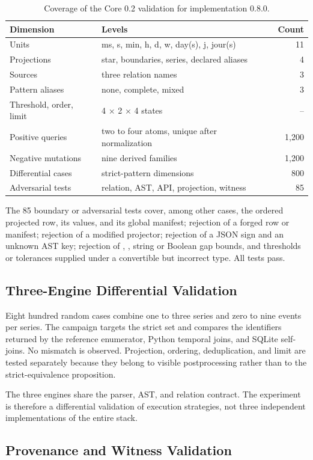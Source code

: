 \begin{table}[H]
\centering
\caption{Coverage of the Core 0.2 validation for implementation 0.8.0.}
\label{tab:compiler-coverage}
\small
\begin{tabularx}{\textwidth}{@{}p{3.3cm}Xr@{}}
\toprule
Dimension & Levels & Count \\
\midrule
Units & ms, s, min, h, d, w, day(s), j, jour(s) & 11 \\
Projections & star, boundaries, series, declared aliases & 4 \\
Sources & three relation names & 3 \\
Pattern aliases & none, complete, mixed & 3 \\
Threshold, order, limit & 4 $\times$ 2 $\times$ 4 states & -- \\
Positive queries & two to four atoms, unique after normalization & 1,200 \\
Negative mutations & nine derived families & 1,200 \\
Differential cases & strict-pattern dimensions & 800 \\
Adversarial tests & relation, AST, API, projection, witness & 85 \\
\bottomrule
\end{tabularx}
\end{table}

The 85 boundary or adversarial tests cover, among other cases, the ordered projected row, its values, and its global manifest; rejection of a forged row or manifest; rejection of a modified projector; rejection of a JSON sign  and an unknown AST key; rejection of , , string or Boolean gap bounds, and thresholds or tolerances supplied under a convertible but incorrect type. All tests pass.

\subsection{Three-Engine Differential Validation}

Eight hundred random cases combine one to three series and zero to nine events per series. The campaign targets the strict set and compares the identifiers returned by the reference enumerator, Python temporal joins, and SQLite self-joins. No mismatch is observed. Projection, ordering, deduplication, and limit are tested separately because they belong to visible postprocessing rather than to the strict-equivalence proposition.

The three engines share the parser, AST, and relation contract. The experiment is therefore a differential validation of execution strategies, not three independent implementations of the entire stack.

\subsection{Provenance and Witness Validation}

